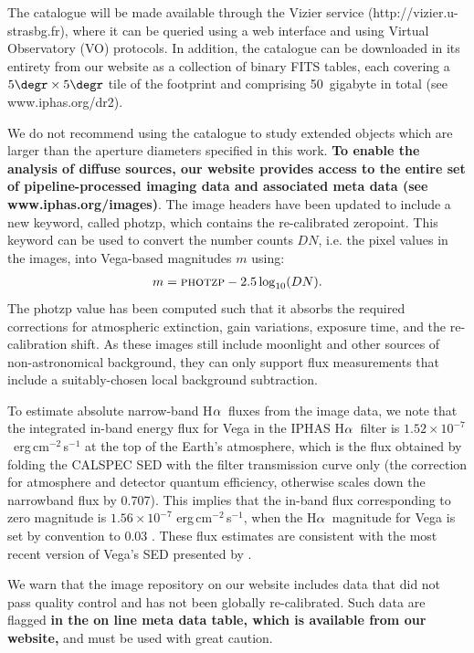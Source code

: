 \documentclass[a4paper,useAMS,usenatbib]{mn2e}
\def\ha{\mbox{H$\rm \alpha$}}
\begin{document}
The catalogue will be made available through the
Vizier service (http://vizier.u-strasbg.fr),
where it can be queried using a web interface
and using Virtual Observatory (VO) protocols.
In addition, the catalogue can be downloaded
in its entirety from our website
as a collection of binary FITS tables,
each covering a $5\degr\times5\degr$ tile
of the footprint and comprising 50~gigabyte
in total (see www.iphas.org/dr2).

We do not recommend using the catalogue
to study extended objects which
are larger than the
aperture diameters specified in this work.
{\bf To enable the analysis of diffuse sources,
our website provides access to the entire set
of pipeline-processed imaging data and
associated meta data
(see www.iphas.org/images)}.
The image headers have been updated to include
a new keyword, called {\sc photzp},
which contains the re-calibrated zeropoint.
This keyword can be used to convert the number counts $DN$,
i.e. the pixel values in the images,
into Vega-based magnitudes $m$ using:
\begin{equation}
\begin{split}
   m  = \textsc{photzp} - 2.5 \log_{10}(DN).
\label{eqn:mag}
\end{split}
\end{equation}
The {\sc photzp} value has been computed such that it
absorbs the required corrections for atmospheric extinction,
gain variations, exposure time, and the re-calibration shift.
As these images still include moonlight and other sources
of non-astronomical background, they can only support flux measurements
that include a suitably-chosen local background subtraction.

To estimate absolute narrow-band \ha\ fluxes from the image data,
we note that the integrated in-band energy flux for Vega 
in the IPHAS \ha\ filter 
is $1.52 \times 10^{-7}$~erg\,cm$^{-2}$\,s$^{-1}$ 
at the top of the Earth's atmosphere,
which is the flux obtained by folding the 
CALSPEC SED with the filter transmission curve only
(the correction for atmosphere and detector quantum efficiency,
otherwise scales down the narrowband flux by 0.707).
This implies that the in-band flux corresponding to
zero magnitude is $1.56 \times 10^{-7}$ erg\,cm$^{-2}$\,s$^{-1}$,
when the \ha\ magnitude for Vega is set by convention to 0.03 \citep{Fukugita1996}.
These flux estimates are consistent with the most recent
version of Vega's SED presented by \citet{Bohlin2014}.

We warn that the image repository on our website
includes data that did not pass quality control
and has not been globally re-calibrated.
Such data are flagged {\bf in the on line meta data table,
which is available from our website,}
and must be used with great caution.
\end{document}
